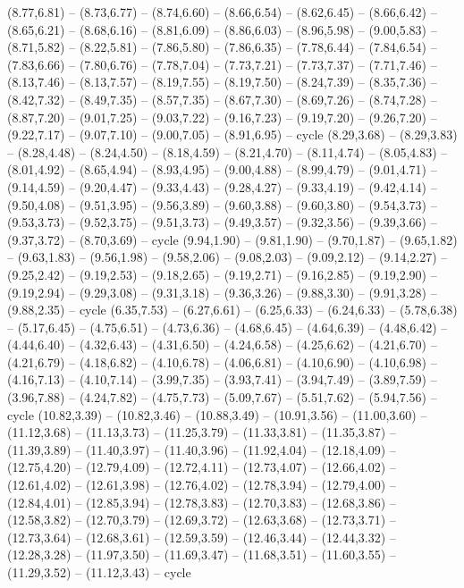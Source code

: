 \expandafter\def\csname geo:gebiet:MN\endcsname{
  (8.77,6.81) -- (8.73,6.77) -- (8.74,6.60) -- (8.66,6.54) -- (8.62,6.45) -- (8.66,6.42) -- (8.65,6.21) -- (8.68,6.16) -- (8.81,6.09) -- (8.86,6.03) -- (8.96,5.98) -- (9.00,5.83) -- (8.71,5.82) -- (8.22,5.81) -- (7.86,5.80) -- (7.86,6.35) -- (7.78,6.44) -- (7.84,6.54) -- (7.83,6.66) -- (7.80,6.76) -- (7.78,7.04) -- (7.73,7.21) -- (7.73,7.37) -- (7.71,7.46) -- (8.13,7.46) -- (8.13,7.57) -- (8.19,7.55) -- (8.19,7.50) -- (8.24,7.39) -- (8.35,7.36) -- (8.42,7.32) -- (8.49,7.35) -- (8.57,7.35) -- (8.67,7.30) -- (8.69,7.26) -- (8.74,7.28) -- (8.87,7.20) -- (9.01,7.25) -- (9.03,7.22) -- (9.16,7.23) -- (9.19,7.20) -- (9.26,7.20) -- (9.22,7.17) -- (9.07,7.10) -- (9.00,7.05) -- (8.91,6.95) -- cycle}
\expandafter\def\csname geo:gebiet:MO\endcsname{
  (8.29,3.68) -- (8.29,3.83) -- (8.28,4.48) -- (8.24,4.50) -- (8.18,4.59) -- (8.21,4.70) -- (8.11,4.74) -- (8.05,4.83) -- (8.01,4.92) -- (8.65,4.94) -- (8.93,4.95) -- (9.00,4.88) -- (8.99,4.79) -- (9.01,4.71) -- (9.14,4.59) -- (9.20,4.47) -- (9.33,4.43) -- (9.28,4.27) -- (9.33,4.19) -- (9.42,4.14) -- (9.50,4.08) -- (9.51,3.95) -- (9.56,3.89) -- (9.60,3.88) -- (9.60,3.80) -- (9.54,3.73) -- (9.53,3.73) -- (9.52,3.75) -- (9.51,3.73) -- (9.49,3.57) -- (9.32,3.56) -- (9.39,3.66) -- (9.37,3.72) -- (8.70,3.69) -- cycle}
\expandafter\def\csname geo:gebiet:MS\endcsname{
  (9.94,1.90) -- (9.81,1.90) -- (9.70,1.87) -- (9.65,1.82) -- (9.63,1.83) -- (9.56,1.98) -- (9.58,2.06) -- (9.08,2.03) -- (9.09,2.12) -- (9.14,2.27) -- (9.25,2.42) -- (9.19,2.53) -- (9.18,2.65) -- (9.19,2.71) -- (9.16,2.85) -- (9.19,2.90) -- (9.19,2.94) -- (9.29,3.08) -- (9.31,3.18) -- (9.36,3.26) -- (9.88,3.30) -- (9.91,3.28) -- (9.88,2.35) -- cycle}
\expandafter\def\csname geo:gebiet:MT\endcsname{
  (6.35,7.53) -- (6.27,6.61) -- (6.25,6.33) -- (6.24,6.33) -- (5.78,6.38) -- (5.17,6.45) -- (4.75,6.51) -- (4.73,6.36) -- (4.68,6.45) -- (4.64,6.39) -- (4.48,6.42) -- (4.44,6.40) -- (4.32,6.43) -- (4.31,6.50) -- (4.24,6.58) -- (4.25,6.62) -- (4.21,6.70) -- (4.21,6.79) -- (4.18,6.82) -- (4.10,6.78) -- (4.06,6.81) -- (4.10,6.90) -- (4.10,6.98) -- (4.16,7.13) -- (4.10,7.14) -- (3.99,7.35) -- (3.93,7.41) -- (3.94,7.49) -- (3.89,7.59) -- (3.96,7.88) -- (4.24,7.82) -- (4.75,7.73) -- (5.09,7.67) -- (5.51,7.62) -- (5.94,7.56) -- cycle}
\expandafter\def\csname geo:gebiet:NC\endcsname{
  (10.82,3.39) -- (10.82,3.46) -- (10.88,3.49) -- (10.91,3.56) -- (11.00,3.60) -- (11.12,3.68) -- (11.13,3.73) -- (11.25,3.79) -- (11.33,3.81) -- (11.35,3.87) -- (11.39,3.89) -- (11.40,3.97) -- (11.40,3.96) -- (11.92,4.04) -- (12.18,4.09) -- (12.75,4.20) -- (12.79,4.09) -- (12.72,4.11) -- (12.73,4.07) -- (12.66,4.02) -- (12.61,4.02) -- (12.61,3.98) -- (12.76,4.02) -- (12.78,3.94) -- (12.79,4.00) -- (12.84,4.01) -- (12.85,3.94) -- (12.78,3.83) -- (12.70,3.83) -- (12.68,3.86) -- (12.58,3.82) -- (12.70,3.79) -- (12.69,3.72) -- (12.63,3.68) -- (12.73,3.71) -- (12.73,3.64) -- (12.68,3.61) -- (12.59,3.59) -- (12.46,3.44) -- (12.44,3.32) -- (12.28,3.28) -- (11.97,3.50) -- (11.69,3.47) -- (11.68,3.51) -- (11.60,3.55) -- (11.29,3.52) -- (11.12,3.43) -- cycle}
